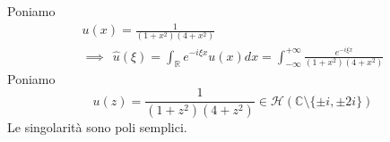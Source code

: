 Poniamo
\begin{gather*}
u( x) =\frac{1}{\left( 1+x^{2}\right)\left( 4+x^{2}\right)}\\
\implies \ \ \hat{u}( \xi ) =\int _{\mathbb{R}} e^{-i\xi x} u( x) dx=\int ^{+\infty }_{-\infty }\frac{e^{-i\xi x}}{\left( 1+x^{2}\right)\left( 4+x^{2}\right)}
\end{gather*}
Poniamo
\begin{equation*}
u( z) =\frac{1}{\left( 1+z^{2}\right)\left( 4+z^{2}\right)} \in \mathcal{H}(\mathbb{C} \setminus \{\pm i,\pm 2i\})
\end{equation*}
Le singolarità sono poli semplici.


\begin{figure}[htpb]
	\centering
{} %

\begin{tikzpicture}[x=0.75pt,y=0.75pt,yscale=-1,xscale=1]


\end{tikzpicture}
\end{figure}
